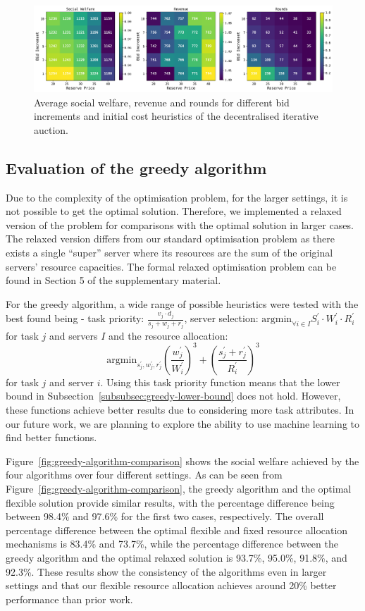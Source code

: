 \begin{figure}[b]
    \centering
    \includegraphics[width=\textwidth]{figs/dia_heuristics/grid_search.pdf}
    \caption{Average social welfare, revenue and rounds for different bid increments and initial cost heuristics of the decentralised iterative auction.}
    \label{fig:dia-heuristic-search}
\end{figure}

\subsection{Evaluation of the greedy algorithm}
\label{subsec:evaluation-of-the-greedy-algorithm}
Due to the complexity of the optimisation problem, for the larger settings, it is not possible to get the optimal solution. Therefore, we implemented a relaxed version of the problem for comparisons with the optimal solution in larger cases. The relaxed version differs from our standard optimisation problem as there exists a single ``super'' server where its resources are the sum of the original servers' resource capacities. The formal relaxed optimisation problem can be found in Section 5 of the supplementary material. 

For the greedy algorithm, a wide range of possible heuristics were tested with the best found being - task priority: $\frac{v_j \cdot d_j}{s_j + w_j + r_j}$, server selection: $\text{argmin}_{\forall i \in I} S^{'}_i \cdot W^{'}_i \cdot R^{'}_i$ for task $j$ and servers $I$ and the resource allocation: \[\text{argmin}_{s^{'}_j, w^{'}_j, r^{'}_j} \left(\frac{w^{'}_j}{W^{'}_i}\right)^3 + \left(\frac{s^{'}_j + r^{'}_j}{R^{'}_i}\right)^3\] for task $j$ and server $i$. Using this task priority function means that the lower bound in Subsection~\ref{subsubsec:greedy-lower-bound} does not  hold.  However, these functions achieve better results due to considering more task attributes. In our future work, we are planning to explore the ability to use machine learning to find better functions.

Figure~\ref{fig:greedy-algorithm-comparison} shows the social welfare achieved by the four algorithms over  four different settings. As can be seen from Figure~\ref{fig:greedy-algorithm-comparison}, the greedy algorithm and the optimal flexible solution provide similar results, with the percentage difference being  between 98.4\% and 97.6\% for the first two cases, respectively. The overall percentage difference between the optimal flexible and fixed resource allocation mechanisms is 83.4\% and 73.7\%, while the percentage difference between the greedy algorithm and the optimal relaxed solution is 93.7\%, 95.0\%, 91.8\%, and 92.3\%. These results show the consistency of the algorithms even in larger settings and that our flexible resource allocation achieves around 20\% better performance than prior work. 

